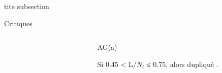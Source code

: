 \begin{frame}{tite subsection}
\begin{block}{Critiques}
{\begin{columns}
\begin{column}{0.3\textwidth}
\begin{figure}
			\end{figure}
		\end{column}
		\begin{column}{0.7\textwidth}
			\begin{itemize}
				\item AG(a)
				\only<3->
				{
				\item Si 0.45 < L/$N_t$ ≤ 0.75, alors dupliqué .
			}
			\end{itemize}
		\end{column}
	\end{columns}
}
\end{block}
\end{frame}
